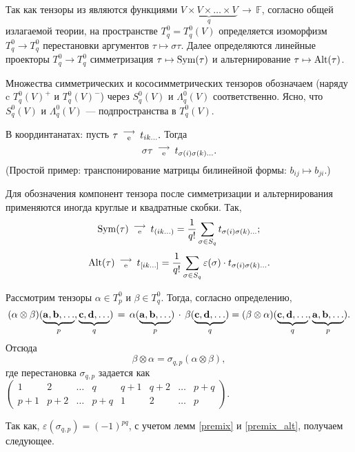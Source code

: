 Так как тензоры из являются функциями 
$\underbrace{V\times V\times \ldots \times V}_q \, \to \, \mathbb{F}$,  
согласно общей излагаемой теории, на пространстве $T^0_q = T^0_q (V) $ определяется изоморфизм $T^0_q\to T^0_q$
перестановки аргументов $\tau \mapsto \sigma \tau$.
Далее определяются линейные проекторы $T^0_q\to T^0_q$ симметризация $\tau \mapsto \mathop{\rm Sym}\nolimits ( \tau)$ и
 альтернирование $\tau \mapsto \mathop{\rm Alt}\nolimits ( \tau)$.

Множества симметрических и кососимметрических тензоров
обозначаем (наряду c $T^0_q (V)^+ $ и $T^0_q (V)^- $) через $S^0_q (V) $ и $\Lambda^0_q (V) $ соответственно.
Ясно, что $S^0_q (V) $ и $\Lambda^0_q (V) $ ---  подпространства в $T^0_q (V) $. 



В координтанатах: пусть 
$\tau \, \, \begin{smallmatrix} \longrightarrow \\ \mathrm{e} \end{smallmatrix} \, \,  
t_{ik \ldots }.   $
Тогда 
$$\sigma \tau \, \, \begin{smallmatrix} \longrightarrow \\ \mathrm{e} \end{smallmatrix} \, \,  
t_{\sigma(i) \sigma(k) \ldots }.    $$
(Простой пример: транспонирование матрицы билинейной формы: $b_{ij} \mapsto b_{ji}$.)

Для обозначения компонент тензора после симметризации и альтернирования применяются иногда 
круглые и квадратные скобки. Так, 
$$\mathop{\rm Sym}\nolimits(\tau ) \, \, \begin{smallmatrix} \longrightarrow \\ \mathrm{e} \end{smallmatrix} \, \,  
t_{(ik \ldots )}  = \dfrac{1}{q!}\sum\limits_{\sigma \in S_q} t_{\sigma(i) \sigma(k) \ldots };   $$
$$\mathop{\rm Alt}\nolimits(\tau ) \, \, \begin{smallmatrix} \longrightarrow \\ \mathrm{e} \end{smallmatrix} \, \,  
t_{[ik \ldots ]}  = \dfrac{1}{q!}\sum\limits_{\sigma \in S_q} \varepsilon(\sigma) \cdot t_{\sigma(i) \sigma(k) \ldots }.    $$



Рассмотрим тензоры  $\alpha \in T^0_p$ и
$\beta \in T^{0}_{q}$.
Тогда, согласно определению,\\
$$(\alpha \otimes \beta)  (\underbrace{\mathbf{a}, \mathbf{b}, \ldots }_{p}, 
\underbrace{\mathbf{c}, \mathbf{d}, \ldots }_{q}) \,  =      \, 
\alpha (\underbrace{\mathbf{a}, \mathbf{b}, \ldots }_{p}) \, \cdot \, 
\beta (\underbrace{\mathbf{c}, \mathbf{d}, \ldots }_{q}) = 
(\beta \otimes \alpha )  (\underbrace{\mathbf{c}, \mathbf{d}, \ldots }_{q}, \underbrace{\mathbf{a}, \mathbf{b}, \ldots }_{p}).$$
Отсюда 
$$\beta \otimes \alpha  = \sigma_{q, p} (\alpha \otimes \beta), $$
где перестановка $\sigma_{q, p}$ задается как
$\begin{pmatrix}
1 & 2 & \ldots &      q & q+1 & q+2 & \ldots & p+q  \\
p+1 & p+2 & \ldots & p+q & 1 & 2 & \ldots & p
\end{pmatrix}.$

Так как, $\varepsilon (\sigma_{q, p})= (-1)^{pq}$, с учетом 
лемм \ref{premix} и \ref{premix_alt}, получаем следующее.


